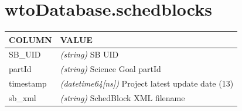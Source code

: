 \documentclass[a4paper,10pt,english]{sphinxmanual}
\begin{document}
\section{wtoDatabase.schedblocks}
\label{wtodata:wtodatabase-schedblocks}
\begin{tabulary}{\linewidth}{|L|L|}
\hline
\textsf{\relax 
COLUMN
} & \textsf{\relax 
VALUE
}\\
\hline
SB\_UID
 & 
\emph{(string)} SB UID
\\

partId
 & 
\emph{(string)} Science Goal partId
\\

timestamp
 & 
\emph{(datetime64{[}ns{]})} Project latest update date (13)
\\

sb\_xml
 & 
\emph{(string)} SchedBlock XML filename
\\
\hline\end{tabulary}
\end{document}
